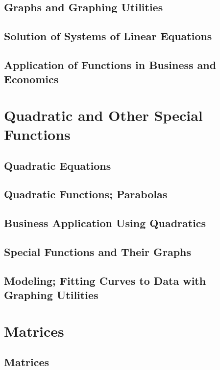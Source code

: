 \documentclass[12pt]{amsart}
\begin{document}
\subsection{Graphs and Graphing Utilities}

\subsection{Solution of Systems of Linear Equations}

\subsection{Application of Functions in Business and Economics}

\section{Quadratic and Other Special Functions}

\subsection{Quadratic Equations}

\subsection{Quadratic Functions; Parabolas}

\subsection{Business Application Using Quadratics}

\subsection{Special Functions and Their Graphs}

\subsection{Modeling; Fitting Curves to  Data with Graphing Utilities}

\newpage
\section{Matrices}

\subsection{Matrices}
\end{document}
